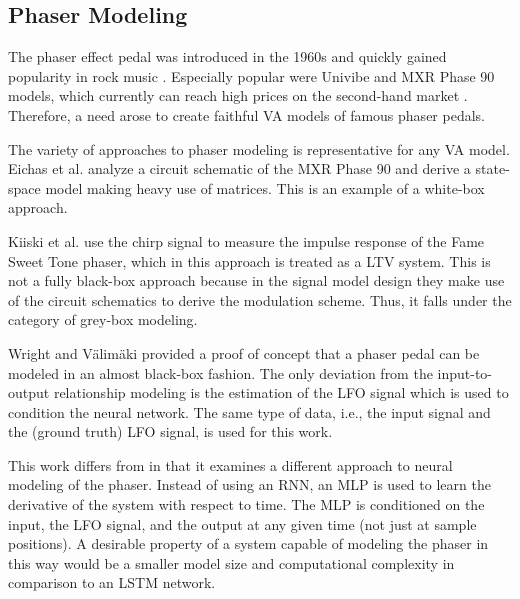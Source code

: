 \subsection{Phaser Modeling}

The phaser effect pedal was introduced in the 1960s \cite{PASPWEB2010} and quickly gained popularity in rock music \cite{Hartmann1978}. Especially popular were Univibe and MXR Phase 90 models, which currently can reach high prices on the second-hand market \cite{Eichas2014,Kiiski2016}. Therefore, a need arose to create faithful \ac{VA} models of famous phaser pedals.

The variety of approaches to phaser modeling is representative for any \ac{VA} model. Eichas et al. \cite{Eichas2014} analyze a circuit schematic of the MXR Phase 90 and derive a state-space model making heavy use of matrices. This is an example of a white-box approach.

Kiiski et al. \cite{Kiiski2016} use the chirp signal to measure the impulse response of the Fame Sweet Tone phaser, which in this approach is treated as a \ac{LTV} system. This is not a fully black-box approach because in the signal model design they make use of the circuit schematics to derive the modulation scheme. Thus, it falls under the category of grey-box modeling.

Wright and V{\"a}lim{\"a}ki \cite{Wright2020} provided a proof of concept that a phaser pedal can be modeled in an almost black-box fashion. The only deviation from the input-to-output relationship modeling is the estimation of the \ac{LFO} signal which is used to condition the neural network. The same type of data, i.e., the input signal and the (ground truth) \ac{LFO} signal, is used for this work.

This work differs from \cite{Wright2020} in that it examines a different approach to neural modeling of the phaser. Instead of using an \ac{RNN}, an \ac{MLP} is used to learn the derivative of the system with respect to time. The \ac{MLP} is conditioned on the input, the \ac{LFO} signal, and the output at any given time (not just at sample positions). A desirable property of a system capable of modeling the phaser in this way would be a smaller model size and computational complexity in comparison to an \ac{LSTM} network.
